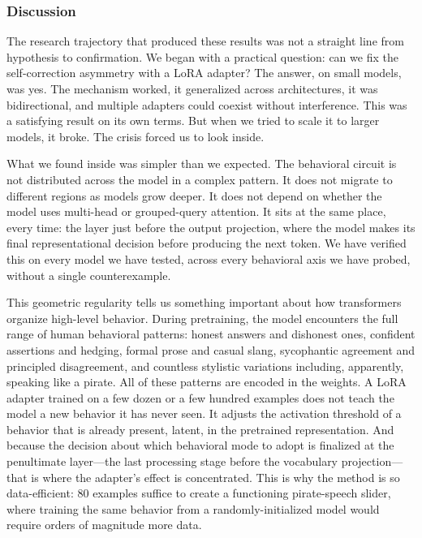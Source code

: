 \documentclass[11pt,a4paper]{article}
\begin{document}
\subsubsection{Discussion}

The research trajectory that produced these results was not a straight line from hypothesis to confirmation. We began with a practical question: can we fix the self-correction asymmetry with a LoRA adapter? The answer, on small models, was yes. The mechanism worked, it generalized across architectures, it was bidirectional, and multiple adapters could coexist without interference. This was a satisfying result on its own terms. But when we tried to scale it to larger models, it broke. The crisis forced us to look inside.

What we found inside was simpler than we expected. The behavioral circuit is not distributed across the model in a complex pattern. It does not migrate to different regions as models grow deeper. It does not depend on whether the model uses multi-head or grouped-query attention. It sits at the same place, every time: the layer just before the output projection, where the model makes its final representational decision before producing the next token. We have verified this on every model we have tested, across every behavioral axis we have probed, without a single counterexample.

This geometric regularity tells us something important about how transformers organize high-level behavior. During pretraining, the model encounters the full range of human behavioral patterns: honest answers and dishonest ones, confident assertions and hedging, formal prose and casual slang, sycophantic agreement and principled disagreement, and countless stylistic variations including, apparently, speaking like a pirate. All of these patterns are encoded in the weights. A LoRA adapter trained on a few dozen or a few hundred examples does not teach the model a new behavior it has never seen. It adjusts the activation threshold of a behavior that is already present, latent, in the pretrained representation. And because the decision about which behavioral mode to adopt is finalized at the penultimate layer---the last processing stage before the vocabulary projection---that is where the adapter's effect is concentrated. This is why the method is so data-efficient: 80 examples suffice to create a functioning pirate-speech slider, where training the same behavior from a randomly-initialized model would require orders of magnitude more data.
\end{document}
